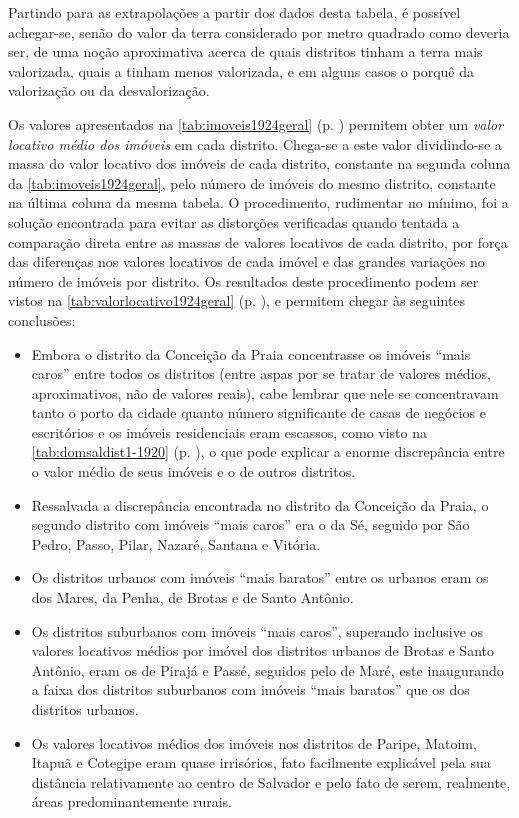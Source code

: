 Partindo para as extrapolações a partir dos dados desta tabela, é possível achegar-se, senão do valor da terra considerado por metro quadrado como deveria ser, de uma noção aproximativa acerca de quais distritos tinham a terra mais valorizada, quais a tinham menos valorizada, e em alguns casos o porquê da valorização ou da desvalorização.

Os valores apresentados na \autoref{tab:imoveis1924geral} (p. \pageref{tab:imoveis1924geral}) permitem obter um \textit{valor locativo médio dos imóveis} em cada distrito. Chega-se a este valor dividindo-se a massa do valor locativo dos imóveis de cada distrito, constante na segunda coluna da \autoref{tab:imoveis1924geral}, pelo número de imóveis do mesmo distrito, constante na última coluna da mesma tabela. O procedimento, rudimentar no mínimo, foi a solução encontrada para evitar as distorções verificadas quando tentada a comparação direta entre as massas de valores locativos de cada distrito, por força das diferenças nos valores locativos de cada imóvel e das grandes variações no número de imóveis por distrito. Os resultados deste procedimento podem ser vistos na \autoref{tab:valorlocativo1924geral} (p. \pageref{tab:valorlocativo1924geral}), e permitem chegar às seguintes conclusões:



\begin{itemize}
\item Embora o distrito da Conceição da Praia concentrasse os imóveis ``mais caros'' entre todos os distritos (entre aspas por se tratar de valores médios, aproximativos, não de valores reais), cabe lembrar que nele se concentravam tanto o porto da cidade quanto número significante de casas de negócios e escritórios e os imóveis residenciais eram escassos, como visto na \autoref{tab:domsaldist1-1920} (p. \pageref{tab:domsaldist1-1920}), o que pode explicar a enorme discrepância entre o valor médio de seus imóveis e o de outros distritos.
\item Ressalvada a discrepância encontrada no distrito da Conceição da Praia, o segundo distrito com imóveis ``mais caros'' era o da Sé, seguido por São Pedro, Passo, Pilar, Nazaré, Santana e Vitória.
\item Os distritos urbanos com imóveis ``mais baratos'' entre os urbanos eram os dos Mares, da Penha, de Brotas e de Santo Antônio.
\item Os distritos suburbanos com imóveis ``mais caros'', superando inclusive os valores locativos médios por imóvel dos distritos urbanos de Brotas e Santo Antônio, eram os de Pirajá e Passé, seguidos pelo de Maré, este inaugurando a faixa dos distritos suburbanos com imóveis ``mais baratos'' que os dos distritos urbanos.
\item Os valores locativos médios dos imóveis nos distritos de Paripe, Matoim, Itapuã e Cotegipe eram quase irrisórios, fato facilmente explicável pela sua distância relativamente ao centro de Salvador e pelo fato de serem, realmente, áreas predominantemente rurais.
\end{itemize}

